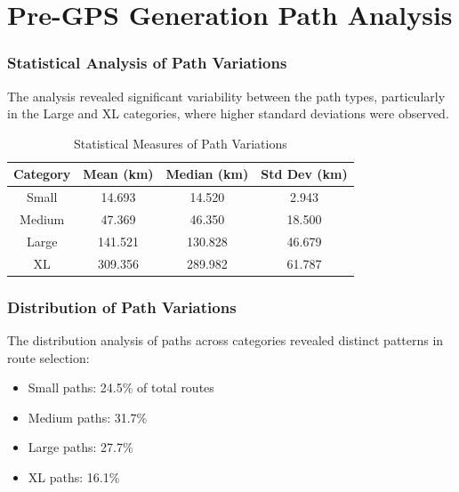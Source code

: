 \documentclass[sigplan,screen]{acmart}
\begin{document}
\section{Pre-GPS Generation Path Analysis}

\subsubsection{Statistical Analysis of Path Variations}
The analysis revealed significant variability between the path types, particularly in the Large and XL categories, where higher standard deviations were observed.

\begin{table}[h!]
\centering
\begin{tabular}{|c|c|c|c|}
\hline
\textbf{Category} & \textbf{Mean (km)} & \textbf{Median (km)} & \textbf{Std Dev (km)} \\
\hline
Small & 14.693 & 14.520 & 2.943 \\
Medium & 47.369 & 46.350 & 18.500 \\
Large & 141.521 & 130.828 & 46.679 \\
XL & 309.356 & 289.982 & 61.787 \\
\hline
\end{tabular}
\caption{Statistical Measures of Path Variations}
\label{tab:path_stats}
\end{table}

\subsubsection{Distribution of Path Variations}
The distribution analysis of paths across categories revealed distinct patterns in route selection:
\begin{itemize}
    \item Small paths: 24.5\% of total routes
    \item Medium paths: 31.7\%
    \item Large paths: 27.7\%
    \item XL paths: 16.1\%
\end{itemize}
\end{document}
